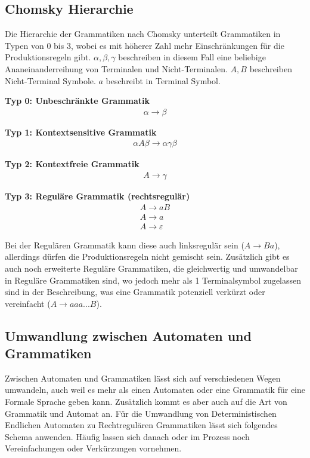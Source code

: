 \subsection{Chomsky Hierarchie}

Die Hierarchie der Grammatiken nach Chomsky unterteilt Grammatiken in Typen von 0
bis 3, wobei es mit höherer Zahl mehr Einschränkungen für die Produktionsregeln gibt.
$\alpha, \beta, \gamma$ beschreiben in diesem Fall eine beliebige Ananeinanderreihung
von Terminalen und Nicht-Terminalen.
$A, B$ beschreiben Nicht-Terminal Symbole.
$a$ beschreibt in Terminal Symbol.

\textbf{Typ 0: Unbeschränkte Grammatik}
\Large
\begin{align*}
    \alpha \rightarrow \beta
\end{align*}
\normalsize

\textbf{Typ 1: Kontextsensitive Grammatik}
\Large
\begin{align*}
    \alpha A \beta \rightarrow \alpha \gamma \beta
\end{align*}
\normalsize

\textbf{Typ 2: Kontextfreie Grammatik}
\Large
\begin{align*}
    A \rightarrow \gamma
\end{align*}
\normalsize

\textbf{Typ 3: Reguläre Grammatik (rechtsregulär)}
\Large
\begin{align*}
    A \rightarrow aB \\
    A \rightarrow a \\
    A \rightarrow \varepsilon
\end{align*}
\normalsize

Bei der Regulären Grammatik kann diese auch linksregulär sein ($A \rightarrow Ba$),
allerdings dürfen die Produktionsregeln nicht gemischt sein.
Zusätzlich gibt es auch noch erweiterte Reguläre Grammatiken, die gleichwertig und
umwandelbar in Reguläre Grammatiken sind, wo jedoch mehr als 1 Terminalsymbol zugelassen
sind in der Beschreibung, was eine Grammatik potenziell verkürzt oder vereinfacht
($A \rightarrow aaa...B$).

\clearpage

\subsection{Umwandlung zwischen Automaten und Grammatiken}

Zwischen Automaten und Grammatiken lässt sich auf verschiedenen Wegen umwandeln,
auch weil es mehr als einen Automaten oder eine Grammatik für eine Formale Sprache
geben kann. Zusätzlich kommt es aber auch auf die Art von Grammatik und Automat an.
Für die Umwandlung von Deterministischen Endlichen Automaten zu Rechtregulären Grammatiken
lässt sich folgendes Schema anwenden.
Häufig lassen sich danach oder im Prozess noch Vereinfachungen oder Verkürzungen vornehmen. 


